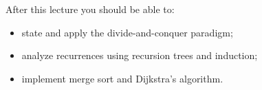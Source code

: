 \documentclass[11pt,a4paper]{article}
\begin{document}
\makelecturetitle

\begin{objectives}
After this lecture you should be able to:
\begin{itemize}
  \item state and apply the divide-and-conquer paradigm;
  \item analyze recurrences using recursion trees and induction;
  \item implement merge sort and Dijkstra's algorithm.
\end{itemize}
\end{objectives}

\tableofcontents
\bigskip








\end{document}
